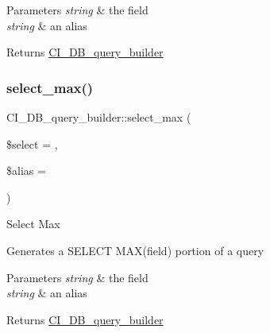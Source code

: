 \begin{DoxyParams}{Parameters}
{\em string} & the field \\
\hline
{\em string} & an alias \\
\hline
\end{DoxyParams}
\begin{DoxyReturn}{Returns}
\mbox{\hyperlink{class_c_i___d_b__query__builder}{C\+I\+\_\+\+D\+B\+\_\+query\+\_\+builder}} 
\end{DoxyReturn}
\mbox{\label{class_c_i___d_b__query__builder_a560a8240d4ac8c5343cc48370fa8b86a}} 
\subsubsection{\texorpdfstring{select\+\_\+max()}{select\_max()}}
{\footnotesize\ttfamily C\+I\+\_\+\+D\+B\+\_\+query\+\_\+builder\+::select\+\_\+max (\begin{DoxyParamCaption}\item[{}]{\$select = {\ttfamily \textquotesingle{}\textquotesingle{}},  }\item[{}]{\$alias = {\ttfamily \textquotesingle{}\textquotesingle{}} }\end{DoxyParamCaption})}

Select Max

Generates a S\+E\+L\+E\+CT M\+A\+X(field) portion of a query


\begin{DoxyParams}{Parameters}
{\em string} & the field \\
\hline
{\em string} & an alias \\
\hline
\end{DoxyParams}
\begin{DoxyReturn}{Returns}
\mbox{\hyperlink{class_c_i___d_b__query__builder}{C\+I\+\_\+\+D\+B\+\_\+query\+\_\+builder}} 
\end{DoxyReturn}
\mbox{\label{class_c_i___d_b__query__builder_a0122c0b40921d1b7d465637db4c1c6dd}} 
